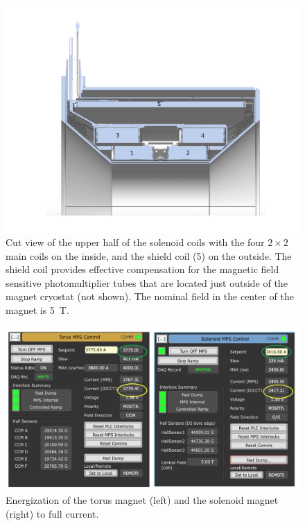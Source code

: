 \documentclass[final,3p,twocolumn]{elsarticle}
\begin{document}
\begin{figure}[th!]
\centerline{\includegraphics[width=1.0\columnwidth]{Solenoid.pdf}}
\caption{Cut view of the upper half of the solenoid coils with the four $2 \times 2$ main coils on the inside, and the
  shield coil (5) on the outside. The shield coil provides effective compensation for the magnetic field sensitive
  photomultiplier tubes that are located just outside of the magnet cryostat (not shown). The nominal field in the
  center of the magnet is 5~T.}
\label{solenoid-coils}
\end{figure}

\begin{figure}[h!]
\centerline{\includegraphics[width=1.8\columnwidth]{Magnets-currents.png}}
\caption{Energization of the torus magnet (left) and the solenoid magnet (right) to full current.}
\label{Magnet-currents1}
\end{figure}
\end{document}
